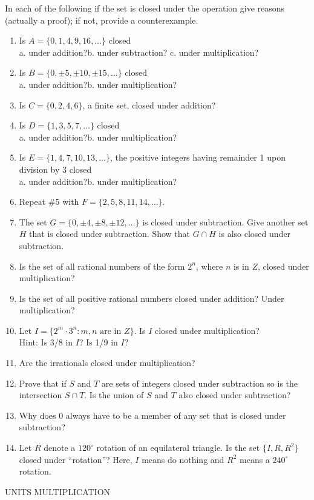 \documentclass[12pt]{article}
\theoremstyle{definition}
\begin{document}
In each of the following if the set is closed under the operation give reasons (actually a proof); if not, provide a counterexample.\\[.1in]
\begin{enumerate}
\item Is $A=\{0,1,4,9,16,\dots\}$ closed\\
a. under addition?\qquad b. under subtraction? \qquad c. under multiplication?
\item Is $B=\{0,\pm5,\pm10,\pm15,\dots\}$ closed\\
a. under addition?\qquad b. under multiplication?
\item Is $C=\{0,2,4,6\}$, a finite set, closed under addition?
\item Is $D=\{1,3,5,7,\dots\}$ closed\\
a. under addition?\qquad b. under multiplication?
\item Is $E=\{1,4,7,10,13,\dots\}$, the positive integers having remainder 1 upon division by 3 closed\\
a. under addition?\qquad b. under multiplication?
\item Repeat \#5 with $F=\{2,5,8,11,14,\dots\}$.
\item The set $G=\{0,\pm4,\pm8,\pm12,\dots\}$ is closed under subtraction.  Give another set $H$ that is closed under subtraction.  Show that $G\cap H$ is also closed under subtraction.
\item Is the set of all rational numbers of the form $2^n$, where $n$ is in $Z$, closed under multiplication?
\item Is the set of all positive rational numbers closed under addition?  Under multiplication?
\item Let $I=\{2^m\cdot3^n:m,n \text{ are in } Z\}$.  Is $I$ closed under multiplication?\\
Hint:  Is 3/8 in $I$?  Is 1/9 in $I$?
\item Are the irrationals closed under multiplication?
\item Prove that if $S$ and $T$ are sets of integers closed under subtraction so is the intersection $S\cap T$.  Is the union of $S$ and $T$ also closed under subtraction?
\item Why does 0 always have to be a member of any set that is closed under subtraction?
\item Let $R$ denote a $120^\circ$ rotation of an equilateral triangle.  Is the set $\{I,R,R^2\}$ closed under ``rotation''?  Here, $I$ means do nothing and $R^2$ means a $240^\circ$ rotation.
\end{enumerate}
\centerline{UNITS MULTIPLICATION}
\end{document}
